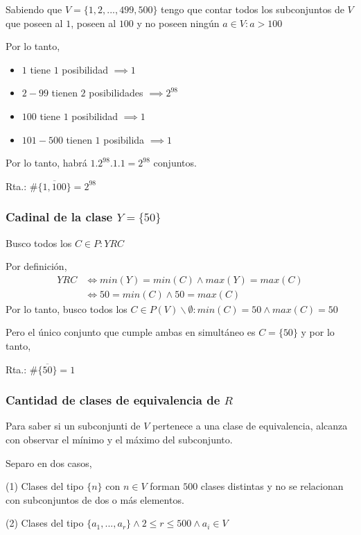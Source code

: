 Sabiendo que $ V = \{ 1,2,...,499,500 \} $ tengo que contar todos los subconjuntos de $V$ que poseen al $1$, poseen al $100$ y no poseen ningún $ a \in V: a > 100 $

Por lo tanto,
\begin{itemize}
    \item $ 1 $ tiene $ 1 $ posibilidad $ \implies 1 $
    \item $ 2-99 $ tienen $ 2 $ posibilidades $ \implies 2^{98} $
    \item $ 100 $ tiene $ 1 $ posibilidad $ \implies 1 $
    \item $ 101-500 $ tienen $ 1 $ posibilida $ \implies 1 $
\end{itemize}
Por lo tanto, habrá $ 1.2^{98}.1.1 = 2^{98} $ conjuntos.

Rta.: $ \# \overline{\{ 1,100 \}} = 2^{98} $

\subsubsection{Cadinal de la clase $ Y = \{ 50 \} $}

Busco todos los $ C \in P: YRC $

Por definición,
\begin{align*}
    YRC &\iff min(Y) = min(C) \wedge max(Y) = max(C) \\
    &\iff 50 = min(C) \wedge 50 = max(C)
\end{align*}
Por lo tanto, busco todos los $C \in P(V) \backslash \emptyset: min(C) = 50 \wedge max(C) = 50 $ 

Pero el único conjunto que cumple ambas en simultáneo es $ C = \{ 50 \} $ y por lo tanto,

Rta.: $ \# \overline{\{ 50 \}} = 1 $

\subsubsection{Cantidad de clases de equivalencia de $R$}

Para saber si un subconjunti de $V$ pertenece a una clase de equivalencia, alcanza con observar el mínimo y el máximo del subconjunto.

Separo en dos casos, 

(1) Clases del tipo $ \{ n \} $ con $ n \in V $ forman $ 500 $ clases distintas y no se relacionan con subconjuntos de dos o más elementos.

(2) Clases del tipo $ \{ a_1, ..., a_r \} \wedge 2 \leq r \leq 500 \wedge a_i \in V $ 

